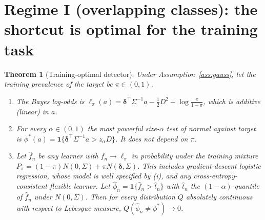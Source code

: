 \documentclass[11pt]{article}
\newtheorem{theorem}{Theorem}[section]
\theoremstyle{definition}
\theoremstyle{remark}
\newcommand{\1}{\mathbf{1}}
\begin{document}
\section{Regime I (overlapping classes): the shortcut is optimal for the training task}\label{sec:overlap}

\begin{theorem}[Training-optimal detector]\label{thm:np}
Under Assumption~\ref{ass:gauss}, let the training prevalence of the target be $\pi\in(0,1)$.
\begin{enumerate}[label=(\roman*)]
\item The Bayes log-odds is $\ell_\pi(a)=\bm\delta^\top\Sigma^{-1}a-\tfrac12D^2+\log\tfrac{\pi}{1-\pi}$, which is additive (linear) in $a$.
\item For every $\alpha\in(0,1)$ the most powerful size-$\alpha$ test of normal against target is $\phi^*(a)=\1\{\bm\delta^\top\Sigma^{-1}a>z_\alpha D\}$. It does not depend on $\pi$.
\item Let $\hat f_n$ be any learner with $\hat f_n\to\ell_\pi$ in probability under the training mixture $P_\pi=(1-\pi)N(0,\Sigma)+\pi N(\bm\delta,\Sigma)$. This includes gradient-descent logistic regression, whose model is well specified by (i), and any cross-entropy-consistent flexible learner. Let $\hat\phi_n=\1\{\hat f_n>\hat t_n\}$ with $\hat t_n$ the $(1-\alpha)$-quantile of $\hat f_n$ under $N(0,\Sigma)$. Then for every distribution $Q$ absolutely continuous with respect to Lebesgue measure, $Q(\hat\phi_n\ne\phi^*)\to0$.
\end{enumerate}
\end{theorem}
\end{document}

